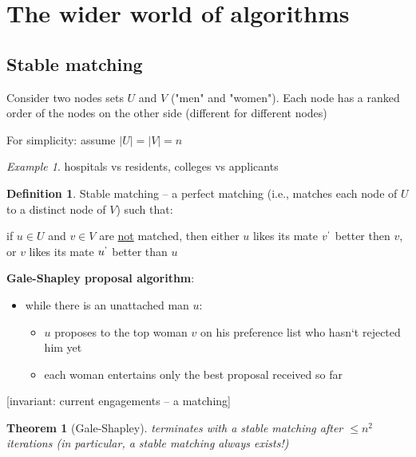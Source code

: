 \documentclass[a4paper,12pt]{article}
\theoremstyle{plain}
\newtheorem*{theorem}{Theorem}
\theoremstyle{definition}
\newtheorem*{definition}{Definition}
\theoremstyle{remark}
\newtheorem*{example}{Example}
\begin{document}
\newpage
\section{The wider world of algorithms}



\subsection{Stable matching}
Consider two nodes sets $U$ and $V$ ("men" and "women"). Each node has a ranked order of the nodes on the other side (different for different nodes)

For simplicity: assume $|U| = |V| = n$

\begin{example}hospitals vs residents, colleges vs applicants\end{example}

\begin{definition}Stable matching -- a perfect matching (i.e., matches each node of $U$ to a distinct node of $V$) such that:

if $u \in U$ and $v \in V$ are \underline{not} matched, then either $u$ likes its mate $v^`$ better then $v$, or $v$ likes its mate $u^`$ better than $u$
\end{definition}

\textbf{Gale-Shapley proposal algorithm}:
\begin{itemize}
	\item while there is an unattached man $u$:
	\begin{itemize}
		\item $u$ proposes to the top woman $v$ on his preference list who hasn`t rejected him yet
		\item each woman entertains only the best proposal received so far
	\end{itemize}
\end{itemize}

[invariant: current engagements -- a matching]

\begin{theorem}[Gale-Shapley] terminates with a stable matching after $\leq n^2$ iterations (in particular, a stable matching always exists!)\end{theorem}
\end{document}
